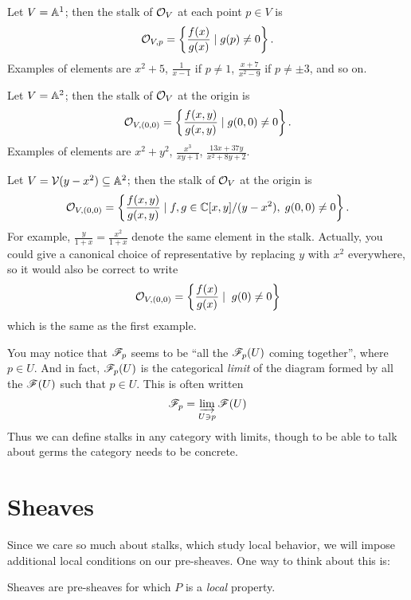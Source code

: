\begin{example}
	\listhack
	\begin{enumerate}[(a)]
		\ii Let $V = \mathbb A^1$; then the stalk of $\mathcal O_V$
		at each point $p \in V$ is
		\[ \mathcal O_{V,p}
			= \left\{ \frac{f(x)}{g(x)} \mid g(p) \ne 0 \right\}. \]
		Examples of elements are $x^2+5$, $\frac{1}{x-1}$ if $p \ne 1$,
		$\frac{x+7}{x^2-9}$ if $p \ne \pm 3$, and so on.

		\ii Let $V = \mathbb A^2$;
		then the stalk of $\mathcal O_V$ at the origin is
		\[ \mathcal O_{V, (0,0)}
			= \left\{ \frac{f(x,y)}{g(x,y)} \mid g(0,0) \ne 0 \right\}. \]
		Examples of elements are $x^2+y^2$,
		$\frac{x^3}{xy+1}$, $\frac{13x+37y}{x^2+8y+2}$.

		\ii Let $V = \mathcal V(y-x^2) \subseteq \mathbb A^2$;
		then the stalk of $\mathcal O_V$ at the origin is
		\[ \mathcal O_{V, (0,0)}
			= \left\{ \frac{f(x,y)}{g(x,y)} \mid f,g \in \mathbb C[x,y] / (y-x^2),
				\; g(0,0) \ne 0 \right\}. \]
		For example, $\frac{y}{1+x} = \frac{x^2}{1+x}$
		denote the same element in the stalk.
		Actually, you could give a canonical choice of representative
		by replacing $y$ with $x^2$ everywhere, so it would also be
		correct to write
		\[ \mathcal O_{V, (0,0)}
			= \left\{ \frac{f(x)}{g(x)} \mid \; g(0) \ne 0 \right\} \]
		which is the same as the first example.
	\end{enumerate}
\end{example}

\begin{remark}
	You may notice that $\mathscr F_p$ seems to be
	``all the $\mathscr F_p(U)$ coming together'', where $p \in U$.
	And in fact, $\mathscr F_p(U)$ is the categorical \emph{limit}
	of the diagram formed by all the $\mathscr F(U)$ such that $p \in U$.
	This is often written
	\[ \mathscr F_p = \varinjlim_{U \ni p} \mathscr F(U) \]
	Thus we can define stalks in any category with limits,
	though to be able to talk about germs the category needs
	to be concrete.
\end{remark}

\section{Sheaves}

Since we care so much about stalks, which study local behavior,
we will impose additional local conditions on our pre-sheaves.
One way to think about this is:
\begin{moral}
	Sheaves are pre-sheaves for which $P$ is a \emph{local} property.
\end{moral}

